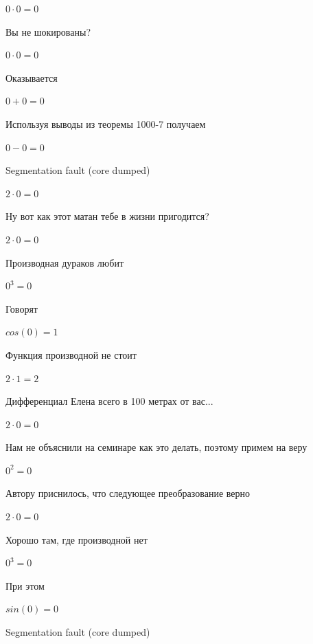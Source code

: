 \documentclass[12pt,a4paper,fleqn]{article}
\begin{document}
\begin{center}$0 \cdot 0 = 0$\end{center}
Вы не шокированы?\cite{link3}

\begin{center}$0 \cdot 0 = 0$\end{center}
Оказывается

\begin{center}$0+0 = 0$\end{center}
Используя выводы из теоремы 1000-7 получаем

\begin{center}$0-0 = 0$\end{center}
Segmentation fault (core dumped)

\begin{center}$2 \cdot 0 = 0$\end{center}
Ну вот как этот матан тебе в жизни пригодится?

\begin{center}$2 \cdot 0 = 0$\end{center}
Производная дураков любит\cite{link2}

\begin{center}$0^{3} = 0$\end{center}
Говорят

\begin{center}$cos(0) = 1$\end{center}
Функция производной не стоит\cite{link2}

\begin{center}$2 \cdot 1 = 2$\end{center}
Дифференциал Елена всего в 100 метрах от вас...

\begin{center}$2 \cdot 0 = 0$\end{center}
Нам не объяснили на семинаре как это делать, поэтому примем на веру

\begin{center}$0^{2} = 0$\end{center}
Автору приснилось, что следующее преобразование верно

\begin{center}$2 \cdot 0 = 0$\end{center}
Хорошо там, где производной нет\cite{link2}

\begin{center}$0^{3} = 0$\end{center}
При этом

\begin{center}$sin(0) = 0$\end{center}
Segmentation fault (core dumped)
\end{document}
